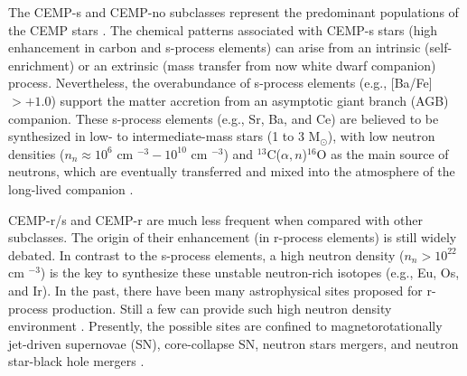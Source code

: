 The CEMP-s and CEMP-no subclasses represent the predominant populations of the
CEMP stars \citep{2005ARA&A..43..531B, 2007ApJ...655..492A,
2016A&A...588A..37H,  2016ApJ...833...20Y}. The chemical patterns associated
with CEMP-s stars (high enhancement in carbon and s-process elements) can arise
from an intrinsic (self-enrichment) or an extrinsic (mass transfer from now
white dwarf companion) process. Nevertheless, the overabundance of s-process
elements (e.g., [Ba/Fe] $> +1.0$) support the matter accretion from an
asymptotic giant branch (AGB) companion. These s-process elements
(e.g., Sr, Ba, and Ce) are believed to be synthesized in low- to
intermediate-mass stars (1 to 3 M$_{\odot}$), with low neutron densities ($n_{n}
\approx 10^{6} $ cm $^{-3} - 10^{10}$ cm $^{-3}$) and $^{13}$C($\alpha,
n$)$^{16}$O as the main source of neutrons, which are eventually
transferred and mixed into the atmosphere of the long-lived companion
\citep[observed as a CEMP-s star,][]{2005ApJ...625..825L,
2014MNRAS.441.1217S}. 
 
CEMP-r/s and CEMP-r are much less frequent when compared with other subclasses.
The origin of their enhancement (in r-process elements) is still widely
debated. In contrast to the s-process elements, a high neutron density ($n_{n}
> 10^{22}$ cm $^{-3}$) is the key to synthesize these
unstable neutron-rich isotopes (e.g., Eu, Os, and Ir). In the past, there have
been many astrophysical sites proposed for r-process production. Still a few
can provide such high neutron density environment \citep[see][and references
therein]{2017ARNPS..67..253T}. Presently, the possible sites are confined to
magnetorotationally jet-driven supernovae (SN), core-collapse SN, neutron
stars mergers, and neutron star-black hole mergers
\citep[e.g.,][]{2018ARNPS..68..237F}.
 
